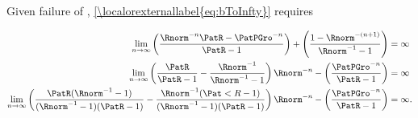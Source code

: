 \documentclass[../BufferStockTheory.tex]{subfiles}
\begin{document}
Given failure of \FHWC, \eqref{\localorexternallabel{eq:bToInfty}} requires

\begin{align}
  \lim_{n \rightarrow \infty} \left(\frac{\Rnorm^{-n}\PatR-\PatPGro^{-n}}{\PatR-1}\right) + \left(\frac{1-\Rnorm^{-(n+1)}}{\Rnorm^{-1}-1}\right)  & = \infty \notag
\\   \lim_{n \rightarrow \infty} \left(\frac{\PatR}{\PatR-1}-\frac{\Rnorm^{-1}}{\Rnorm^{-1}-1}\right)\Rnorm^{-n}-\left(\frac{\PatPGro^{-n}}{\PatR-1}\right)  & = \infty \notag
\\   \lim_{n \rightarrow \infty} \left(\frac{\PatR(\Rnorm^{-1}-1)}{(\Rnorm^{-1}-1)(\PatR-1)}-\frac{\Rnorm^{-1}(\Pat<R-1)}{(\Rnorm^{-1}-1)(\PatR-1)}\right)\Rnorm^{-n}-\left(\frac{\PatPGro^{-n}}{\PatR-1}\right)  & = \infty. \label{eq:FHWCfails}
\end{align}
\end{document}
